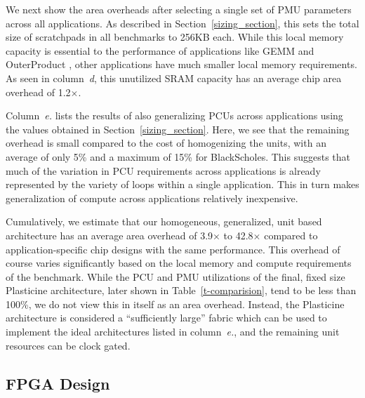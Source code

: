 We next show the area overheads after selecting a single set of PMU parameters across all applications. 
As described in Section~\ref{sizing_section}, this sets the total size of scratchpads in all benchmarks to 256KB each.
While this local memory capacity is essential to the performance of applications like GEMM and OuterProduct \cite{LAP_TC12}, other applications have much smaller local memory requirements.
As seen in column~\emph{d}, this unutilized SRAM capacity has an average chip area overhead of 1.2$\times$.

Column~\emph{e.} lists the results of also generalizing PCUs across applications using the values obtained in Section~\ref{sizing_section}.
Here, we see that the remaining overhead is small compared to the cost of homogenizing the units, with an average of only 5\% and a maximum of 15\% for BlackScholes.
This suggests that much of the variation in PCU requirements across applications is already represented by the variety of loops within a single application.
This in turn makes generalization of compute across applications relatively inexpensive.

Cumulatively, we estimate that our homogeneous, generalized, unit based architecture has an average area overhead of 3.9$\times$ to 42.8$\times$ compared to application-specific chip designs with the same performance. 
This overhead of course varies significantly based on the local memory and compute requirements of the benchmark.
While the PCU and PMU utilizations of the final, fixed size Plasticine architecture, later shown in Table~\ref{t-comparision}, tend to be less than 100\%, we do not view this in itself as an area overhead. 
Instead, the Plasticine architecture is considered a ``sufficiently large'' fabric which can be used to 
implement the ideal architectures listed in column~\emph{e.}, and the remaining unit resources can be clock gated.


\subsection{FPGA Design}

